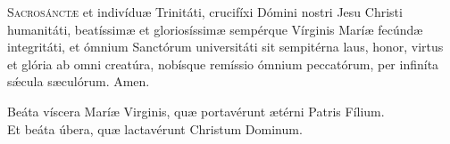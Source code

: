 \documentclass[a4paper, twoside, 12pt]{article}
\begin{document}
\lettrine{{\color{red}S}}{acrosánctæ} et indivíduæ Trinitáti,
crucifíxi Dómini nostri Jesu Christi humanitáti,
beatíssimæ et gloriosíssimæ sempérque Vírginis Maríæ
fecúndæ integritáti, 
et ómnium Sanctórum universitáti
sit sempitérna laus, honor, virtus et glória
ab omni creatúra,
nobísque remíssio ómnium peccatórum,
per infiníta sǽcula sæculórum.
\Rbardot{} Amen.

\noindent \Vbardot{} Beáta víscera Maríæ Virginis, quæ portavérunt
ætérni Patris Fílium.\\
\Rbardot{} Et beáta úbera, quæ lactavérunt Christum Dominum.


\trOratioPostOfficium

\vfill


\cantusSineNeumas

\label{deusinadiutorium}


\vfill
\pagebreak

\cantusCumNeumis

 


\trAntI

\cantusSineNeumas




\vfill
\pagebreak

 


\trAntII





\vfill
\pagebreak

 
\end{document}
